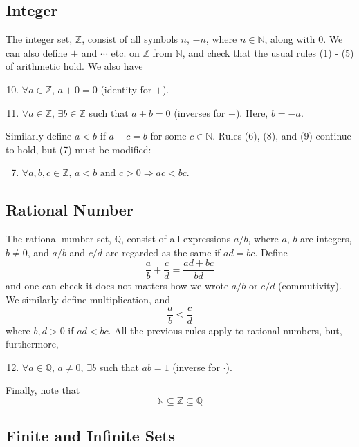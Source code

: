 \documentclass[10pt, a4paper, twoside]{report}
\begin{document}
\subsection{Integer}
The integer set, \(\mathbb{Z}\), consist of all symbols \(n\), \(-n\), where \(n\in\mathbb{N}\), along with \(0\). We can also define \(+\) and \(\cdots\) etc. on \(\mathbb{Z}\) from \(\mathbb{N}\), and check that the usual rules (1) - (5) of arithmetic hold. We also have
\begin{enumerate}
    \setcounter{enumi}{9}
    \item \(\forall a\in\mathbb{Z}\), \(a+0=0\) \space (identity for \(+\)).
    \item \(\forall a\in\mathbb{Z}\), \(\exists b\in\mathbb{Z}\) such that \(a+b=0\) \space (inverses for \(+\)). Here, \(b=-a\).
\end{enumerate}
Similarly define \(a<b\) if \(a+c=b\) for some \(c\in\mathbb{N}\). Rules (6), (8), and (9) continue to hold, but (7) must be modified:
\begin{enumerate}
    \setcounter{enumi}{6}
    \item \(\forall a,b,c\in\mathbb{Z}\), \(a<b\text{  and  }c>0\Rightarrow ac<bc\).
\end{enumerate}
\subsection{Rational Number}
The rational number set, \(\mathbb{Q}\), consist of all expressions \(a/b\), where \(a\), \(b\) are integers, \(b\neq 0\), and \(a/b\) and \(c/d\) are regarded as the same if \(ad=bc\). Define 
\[\frac ab+\frac cd=\frac{ad+bc}{bd}\]
and one can check it does not matters how we wrote \(a/b\) or \(c/d\) (commutivity). We similarly define multiplication, and
\[\frac ab<\frac cd\]
where \(b,d>0\) if \(ad<bc\). All the previous rules apply to rational numbers, but, furthermore,
\begin{enumerate}
    \setcounter{enumi}{11}
    \item \(\forall a\in\mathbb{Q}\), \(a\neq 0\), \(\exists b\) such that \(ab=1\) \space (inverse for \(\cdot\)).
\end{enumerate}
Finally, note that
\[\mathbb{N}\subseteq\mathbb{Z}\subseteq\mathbb{Q}\]
\subsection{Finite and Infinite Sets}
\end{document}
